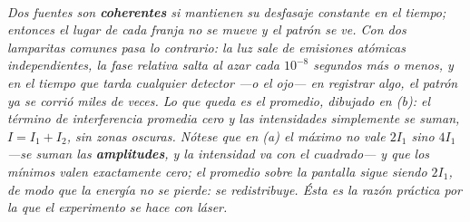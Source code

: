 \begin{center}
\\[0.5em]
{\small\itshape Dos fuentes son \textbf{coherentes} si mantienen su desfasaje
constante en el tiempo; entonces el lugar de cada franja no se mueve y el patrón
se ve. Con dos lamparitas comunes pasa lo contrario: la luz sale de emisiones
atómicas independientes, la fase relativa salta al azar cada $10^{-8}$ segundos
más o menos, y en el tiempo que tarda cualquier detector ---o el ojo--- en
registrar algo, el patrón ya se corrió miles de veces. Lo que queda es el
promedio, dibujado en (b): el término de interferencia promedia cero y las
intensidades simplemente se suman, $I = I_1 + I_2$, sin zonas oscuras. Nótese
que en (a) el máximo no vale $2I_1$ sino $4I_1$ ---se suman las
\textbf{amplitudes}, y la intensidad va con el cuadrado--- y que los mínimos
valen exactamente cero; el promedio sobre la pantalla sigue siendo $2I_1$, de
modo que la energía no se pierde: se redistribuye. Ésta es la razón práctica
por la que el experimento se hace con láser.}
\end{center}

